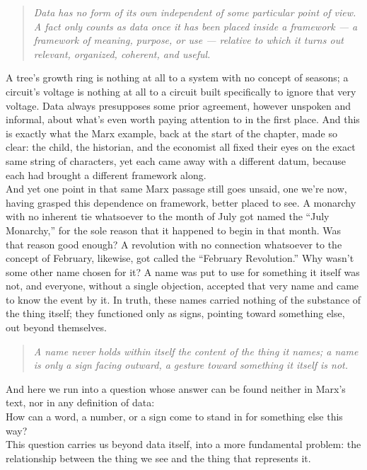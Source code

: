 \begin{quote}
\itshape
Data has no form of its own independent of some particular point of view. A fact only counts as data once it has been placed inside a framework --- a framework of meaning, purpose, or use --- relative to which it turns out relevant, organized, coherent, and useful.
\end{quote}
A tree's growth ring is nothing at all to a system with no concept of seasons; a circuit's voltage is nothing at all to a circuit built specifically to ignore that very voltage. Data always presupposes some prior agreement, however unspoken and informal, about what's even worth paying attention to in the first place. And this is exactly what the Marx example, back at the start of the chapter, made so clear: the child, the historian, and the economist all fixed their eyes on the exact same string of characters, yet each came away with a different datum, because each had brought a different framework along.\\
And yet one point in that same Marx passage still goes unsaid, one we're now, having grasped this dependence on framework, better placed to see. A monarchy with no inherent tie whatsoever to the month of July got named the ``July Monarchy,'' for the sole reason that it happened to begin in that month. Was that reason good enough? A revolution with no connection whatsoever to the concept of February, likewise, got called the ``February Revolution.'' Why wasn't some other name chosen for it? A name was put to use for something it itself was not, and everyone, without a single objection, accepted that very name and came to know the event by it. In truth, these names carried nothing of the substance of the thing itself; they functioned only as signs, pointing toward something else, out beyond themselves.

\begin{quote}
\itshape
A name never holds within itself the content of the thing it names; a name is only a sign facing outward, a gesture toward something it itself is not.
\end{quote}
And here we run into a question whose answer can be found neither in Marx's text, nor in any definition of data:\\
How can a word, a number, or a sign come to stand in for something else this way?\\
This question carries us beyond data itself, into a more fundamental problem: the relationship between the thing we see and the thing that represents it.